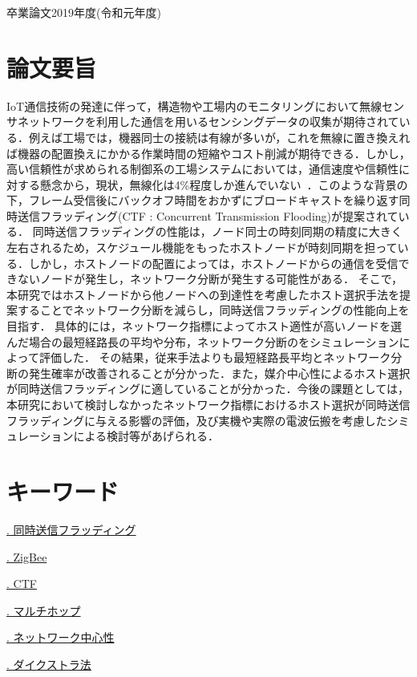 
\newcommand{\keyword}[1]{\addtocounter{keywordcnt}{1} \underline{\thekeywordcnt . #1} }
{\Large
\begin{center}
卒業論文2019年度(令和元年度) \\
\end{center}
}
\section*{論文要旨}

\indent IoT通信技術の発達に伴って，構造物や工場内のモニタリングにおいて無線センサネットワークを利用した通信を用いるセンシングデータの収集が期待されている．例えば工場では，機器同士の接続は有線が多いが，これを無線に置き換えれば機器の配置換えにかかる作業時間の短縮やコスト削減が期待できる．しかし，高い信頼性が求められる制御系の工場システムにおいては，通信速度や信頼性に対する懸念から，現状，無線化は4\%程度しか進んでいない~\cite{IoT}．このような背景の下，フレーム受信後にバックオフ時間をおかずにブロードキャストを繰り返す同時送信フラッディング(CTF : Concurrent Transmission Flooding)が提案されている．
同時送信フラッディングの性能は，ノード同士の時刻同期の精度に大きく左右されるため，スケジュール機能をもったホストノードが時刻同期を担っている．しかし，ホストノードの配置によっては，ホストノードからの通信を受信できないノードが発生し，ネットワーク分断が発生する可能性がある．
そこで，本研究ではホストノードから他ノードへの到達性を考慮したホスト選択手法を提案することでネットワーク分断を減らし，同時送信フラッディングの性能向上を目指す．
具体的には，ネットワーク指標によってホスト適性が高いノードを選んだ場合の最短経路長の平均や分布，ネットワーク分断のをシミュレーションによって評価した．
その結果，従来手法よりも最短経路長平均とネットワーク分断の発生確率が改善されることが分かった．また，媒介中心性によるホスト選択が同時送信フラッディングに適していることが分かった．今後の課題としては，本研究において検討しなかったネットワーク指標におけるホスト選択が同時送信フラッディングに与える影響の評価，及び実機や実際の電波伝搬を考慮したシミュレーションによる検討等があげられる．


\vspace{-5mm}

\section*{キーワード}\vspace{-3mm}
\keyword{同時送信フラッディング}
\keyword{ZigBee}
\keyword{CTF}
\keyword{マルチホップ}
\keyword{ネットワーク中心性}
\keyword{ダイクストラ法}



\thispagestyle{fancy}
\renewcommand{\headrulewidth}{0.0pt}
